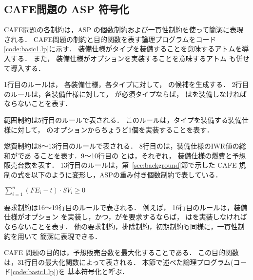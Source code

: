 \subsection{CAFE問題の ASP 符号化}

 

CAFE問題の各制約は，ASP の個数制約および一貫性制約を使って簡潔に表現される．
CAFE問題の制約と目的関数を表す論理プログラムをコード\ref{code:basic1.lp}に示す．
装備仕様がタイプを装備することを意味するアトムを導入する．
また，
装備仕様がオプションを実装することを意味するアトム
も併せて導入する．

1行目のルールは，
各装備仕様，各タイプに対して，
の候補を生成する．
2行目のルールは，各装備仕様に対して，
が必須タイプならば，
はを装備しなければならないことを表す．

範囲制約は5行目のルールで表される．
このルールは，タイプを装備する装備仕様に対して，
のオプションからちょうど1個を実装することを表す．

燃費制約は8〜13行目のルールで表される．
8行目のは，装備仕様のIWR値の総和がであ
ることを表す．9〜10行目の
とは，それぞれ，
装備仕様の燃費と予想販売台数を表す．
13行目のルールは，第~\ref{sec:background}節で示した
CAFE 規制の式を以下のように変形し，ASPの重み付き個数制約で表している．
\begin{center}
\(\sum_{i=1}^{n} (FE_{i}-t)\cdot SV_{i} \geq 0\)  
\end{center}

要求制約は16〜19行目のルールで表される．
例えば，
16行目のルールは，装備仕様がオプション
を実装し，かつ，がを要求するならば，
はを実装しなければならないことを表す．
他の要求制約，排除制約，初期制約も同様に，一貫性制約を用いて
簡潔に表現できる．

CAFE 問題の目的は，予想販売台数を最大化することである．
この目的関数は，31行目の最大化関数によって表される．
%
本節で述べた論理プログラム(コード\ref{code:basic1.lp})を
基本符号化と呼ぶ．

